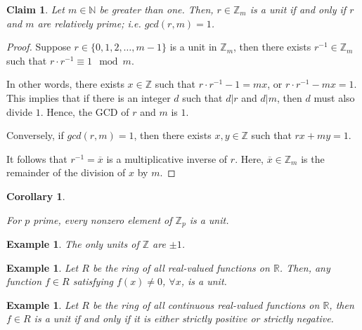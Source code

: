 \documentclass[a4paper,12pt]{report}
\newcommand{\ol}[1]{\overline{#1}}
\newcounter{statement}
\numberwithin{statement}{chapter}
\newtheorem{claim}[statement]{Claim}
\newtheorem{cor}[statement]{Corollary}
\newtheorem{eg}[statement]{\bf Example}
\numberwithin{equation}{chapter}
\numberwithin{section}{chapter}
\numberwithin{subsection}{section}
\begin{document}
\begin{claim}
Let $m \in \mathbb{N}$ be greater than one.  Then, $r \in \mathbb{Z}_m$ is a unit
if and only if $r$ and $m$ are relatively prime; i.e. $gcd(r, m) = 1$.
\end{claim}
\begin{proof}

Suppose $r \in \{0, 1, 2,\ldots, m - 1\}$ is a unit in $\mathbb{Z}_m$, then
there exists $r^{-1} \in \mathbb{Z}_m$ such that $r\cdot r^{-1} \equiv 1 \mod m$.


In other words,
there exists $x \in \mathbb{Z}$ such that $r\cdot r^{-1} - 1 = mx$, or $r\cdot r^{-1} - mx = 1$.
This implies that if there is an integer $d$ such that  $d | r$ and $d | m$,
then $d$ must also divide $1$.  Hence, the GCD of $r$ and $m$ is $1$.


Conversely, if $gcd(r, m) = 1$, then there exists $x, y \in \mathbb{Z}$ such that $rx + my = 1$.


It follows that $r^{-1} = \ol{x}$ is a multiplicative inverse of $r$.
Here, $\ol{x} \in \mathbb{Z}_m$ is the remainder of the division of $x$ by $m$.


\end{proof}



\begin{cor}
\label{cor:zpfield}



For $p$ prime, every nonzero element of $\mathbb{Z}_p$ is a unit.

\end{cor}




\begin{eg}
The only units of $\mathbb{Z}$ are $\pm 1$.
\end{eg}



\begin{eg}

Let $R$ be the ring of all real-valued functions on $\mathbb{R}$.
Then, any function $f \in R$  satisfying $f(x) \neq 0$, $\forall x$, is a unit.

\end{eg}



\begin{eg}

Let $R$ be the ring of all continuous real-valued functions on $\mathbb{R}$,
then $f \in R$ is a unit if and only if it is either strictly positive or strictly negative.

\end{eg}
\end{document}
